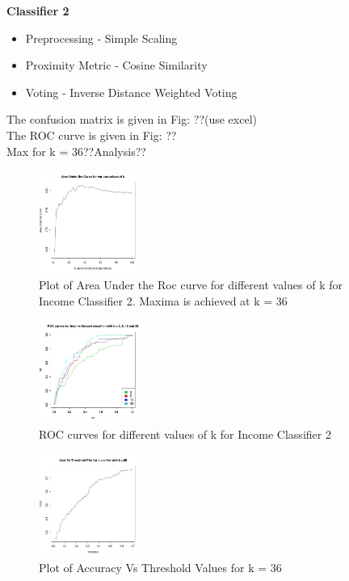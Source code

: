 \textbf{Classifier 2}\\
	\begin{itemize}
		\item Preprocessing - Simple Scaling
		\item Proximity Metric - Cosine Similarity
		\item Voting - Inverse Distance Weighted Voting
	\end{itemize}
	The confusion matrix is given in Fig: ??(use excel)\\
	The ROC curve is given in Fig: ??\\
	Max for k = 36??Analysis??\\
	\begin{figure}[h]
		\label{fig:classifier2_auc}
		\caption{Plot of Area Under the Roc curve for different values of k for Income Classifier 2. Maxima is achieved at k = 36}
		\centering
		\includegraphics[width=0.3\textwidth]{images/income_classifier2/auc.jpg}
	\end{figure}	
	\begin{figure}
		\label{fig:classifier2_roc}
		\caption{ROC curves for different values of k for Income Classifier 2}
		\centering
		\includegraphics[width=0.3\textwidth]{images/income_classifier2/roc.jpg}
	\end{figure}
	\begin{figure}
		\label{fig:classifier2_accuracy}
		\caption{Plot of Accuracy Vs Threshold Values for k = 36}
		\centering
		\includegraphics[width=0.3\textwidth]{images/income_classifier2/accuracy.jpg}
	\end{figure}
	
